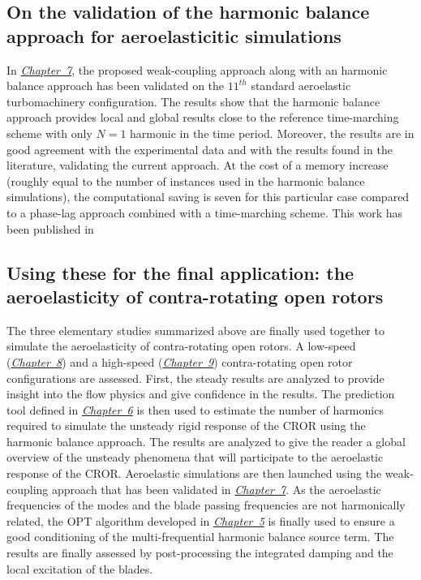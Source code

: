 \subsection*{On the validation of the harmonic balance approach for aeroelasticitic simulations}

In \hyperref[cha:stcf11]{\emph{Chapter~7}}, 
the proposed weak-coupling approach along with
an harmonic balance approach has been
validated on the $11^{th}$ standard aeroelastic turbomachinery
configuration.
The results show that the harmonic balance approach provides local
and global results close to the reference time-marching scheme 
with only $N=1$ harmonic in the time period. 
Moreover, the results are
in good agreement with the experimental data and with the results
found in the literature, validating the current approach.
At the cost of a memory
increase (roughly equal to the number of instances used in the harmonic balance
simulations), the computational saving is seven for this
particular case compared to a phase-lag approach combined
with a time-marching scheme. 
This work has been published in
\begin{quote}
\end{quote}

\subsection*{Using these for the final application: the aeroelasticity of contra-rotating open rotors}

The three elementary studies summarized above 
are finally used together 
to simulate the aeroelasticity
of contra-rotating open rotors. A low-speed 
(\hyperref[cha:dream_ls_isolated]{\emph{Chapter~8}})
and a high-speed (\hyperref[cha:dream_hs_isolated]{\emph{Chapter~9}})
contra-rotating open rotor configurations are assessed. First,
the steady results are analyzed to provide insight into the flow
physics and give confidence in the results. The prediction tool
defined in \hyperref[cha:limitations_convergence]{\emph{Chapter~6}}
is then used to estimate the number of harmonics required to
simulate the unsteady rigid response of the CROR using the harmonic
balance approach.
The results are analyzed
to give the reader a global overview of the unsteady phenomena
that will participate to the aeroelastic response of the CROR.
Aeroelastic simulations are then launched using the weak-coupling
approach that has been validated in \hyperref[cha:stcf11]{\emph{Chapter~7}}.
As the aeroelastic frequencies of the modes and the blade passing frequencies
are not harmonically related, the OPT algorithm developed in 
\hyperref[cha:limitations_condition_number]{\emph{Chapter~5}}
is finally used to ensure a good conditioning of the multi-frequential
harmonic balance source term. 
The results are finally assessed by post-processing the integrated damping
and the local excitation of the blades.



